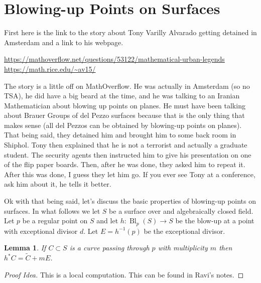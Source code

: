 \documentclass[12pt]{article}
\numberwithin{equation}{section}
\newtheorem{lemma}[theorem]{Lemma}
\theoremstyle{definition}
\theoremstyle{remark}
\newcommand{\Bl}{\operatorname{Bl}}
\begin{document}
\section{Blowing-up Points on Surfaces}
First here is the link to the story about Tony Varilly Alvarado getting detained in Amsterdam and a link to his webpage.
\begin{center}
	\url{https://mathoverflow.net/questions/53122/mathematical-urban-legends}\\
	\url{https://math.rice.edu/~av15/}
\end{center}
The story is a little off on MathOverflow. 
He was actually in Amsterdam (so no TSA), he did have a big beard at the time, and he was talking to an Iranian Mathematician about blowing up points on planes.
He must have been talking about Brauer Groups of del Pezzo surfaces because that is the only thing that makes sense (all del Pezzos can be obtained by blowing-up points on planes). 
That being said, they detained him and brought him to some back room in Shiphol.
Tony then explained that he is not a terrorist and actually a graduate student. 
The security agents then instructed him to give his presentation on one of the flip paper boards. 
Then, after he was done, they asked him to repeat it. 
After this was done, I guess they let him go. 
If you ever see Tony at a conference, ask him about it, he tells it better.

Ok with that being said, let's discuss the basic properties of blowing-up points on surfaces. 
In what follows we let $S$ be a surface over and algebraically closed field.
Let $p$ be a regular point on $S$ and let $h:\Bl_p(S) \to S$ be the blow-up at a point with exceptional divisor $d$. 
Let $E=h^{-1}(p)$ be the exceptional divisor.

\begin{lemma}
	If $C \subset S$ is a curve passing through $p$ with multiplicity $m$ then $h^*C=\widetilde{C}+mE$. 
\end{lemma}
\begin{proof}[Proof Idea]
	This is a local computation. This can be found in Ravi's notes. 
\end{proof}
\end{document}
